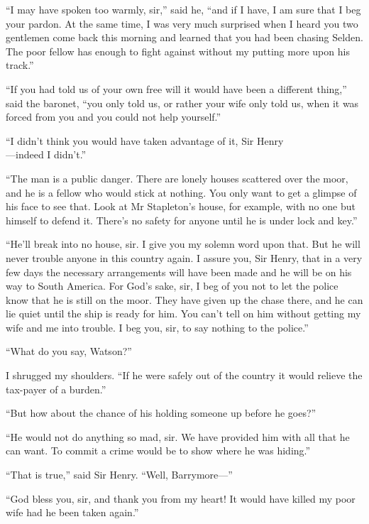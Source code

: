 \documentclass[paper=5.5in:8.5in,BCOR=7mm,twoside,DIV=calc,12pt,usegeometry,openany,chapterprefix,endperiod]{scrbook} %
\begin{document}
\enquote{I may have spoken too warmly, sir,} said he, \enquote{and if I have, I am sure that I beg your pardon. At the same time, I was very much surprised when I heard you two gentlemen come back this morning and learned that you had been chasing Selden. The poor fellow has enough to fight against without my putting more upon his track.}

\enquote{If you had told us of your own free will it would have been a different thing,} said the baronet, \enquote{you only told us, or rather your wife only told us, when it was forced from you and you could not help yourself.}

\enquote{I didn't think you would have taken advantage of it, Sir Henry\\ \nobreakdash---indeed I didn't.}

\enquote{The man is a public danger. There are lonely houses scattered over the moor, and he is a fellow who would stick at nothing. You only want to get a glimpse of his face to see that. Look at Mr Stapleton's house, for example, with no one but himself to defend it. There's no safety for anyone until he is under lock and key.}

\enquote{He'll break into no house, sir. I give you my solemn word upon that. But he will never trouble anyone in this country again. I assure you, Sir Henry, that in a very few days the necessary arrangements will have been made and he will be on his way to South America. For God's sake, sir, I beg of you not to let the police know that he is still on the moor. They have given up the chase there, and he can lie quiet until the ship is ready for him. You can't tell on him without getting my wife and me into trouble. I beg you, sir, to say nothing to the police.}

\enquote{What do you say, Watson?}

I shrugged my shoulders. \enquote{If he were safely out of the country it would relieve the tax-payer of a burden.}

\enquote{But how about the chance of his holding someone up before he goes?}

\enquote{He would not do anything so mad, sir. We have provided him with all that he can want. To commit a crime would be to show where he was hiding.}

\enquote{That is true,} said Sir Henry. \enquote{Well, Barrymore\nobreakdash---}

\enquote{God bless you, sir, and thank you from my heart! It would have killed my poor wife had he been taken again.}
\end{document}

